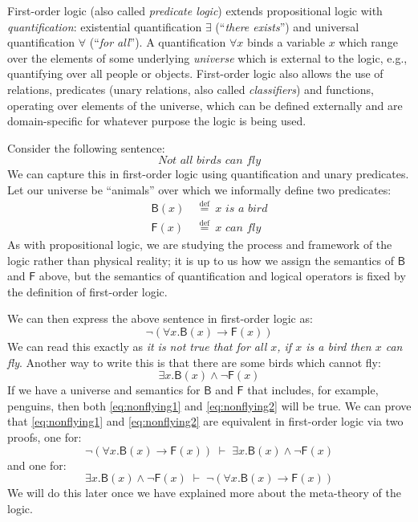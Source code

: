 \renewcommand{\highlight}[1]{%
  \colorbox{yellow!50}{$\displaystyle#1$}}
\newcommand{\highlightG}[1]{%
  \colorbox{green!30}{$\displaystyle#1$}}
\newcommand{\highlightR}[1]{%
  \colorbox{red!20}{$\displaystyle#1$}}

\newcommand{\rel}[1]{\mathsf{#1}}


First-order logic (also called \emph{predicate logic}) extends
propositional logic with \emph{quantification}: existential quantification
$\exists$ (``\emph{there exists}'') and universal quantification
$\forall$ (``\emph{for all}''). A quantification $\forall x$
binds a variable $x$ which range over the elements of some underlying
\emph{universe} which is external to the logic, e.g., quantifying
over all people or objects.  First-order logic also
allows the use of relations, predicates (unary relations, also called
\emph{classifiers}) and functions, operating
over elements of the universe, which can
be defined externally and are
domain-specific for whatever purpose the logic is being used.

Consider the following sentence:
%
\begin{equation*}
  \textit{Not all birds can fly}
\end{equation*}
%
We can capture this in first-order logic using quantification and
unary predicates. Let our universe be ``animals''
over which we informally define two predicates:
%
\begin{align*}
  \rel{B}(x)\ & \stackrel{\text{def}}{=}\ \textit{$x$ is a bird} \\
  \rel{F}(x)\ & \stackrel{\text{def}}{=}\ \textit{$x$ can fly}
\end{align*}
%
As with propositional logic, we are studying the process and framework
of the logic rather than physical reality; it is up to us how we
assign the semantics of $\rel{B}$ and $\rel{F}$ above, but the
semantics of quantification and logical operators is fixed by the
definition of first-order logic.

We can then express the above sentence in first-order logic as:
%
\begin{equation}
  \neg (\forall x . \rel{B}(x) \rightarrow \rel{F}(x))
  \label{eq:nonflying1}
\end{equation}
%
We can read this exactly as \emph{it is not true that for all $x$, if
  $x$ is a bird then $x$ can fly}. Another way to write this is
that there are some birds which cannot fly:
%
\begin{equation}
  \exists x . \rel{B}(x) \wedge \neg \rel{F}(x)
    \label{eq:nonflying2}
\end{equation}
%
If we have a universe and semantics for $\rel{B}$ and $\rel{F}$ that includes, for
example, penguins, then both \eqref{eq:nonflying1} and
\eqref{eq:nonflying2} will be true.
We can prove that \eqref{eq:nonflying1} and
\eqref{eq:nonflying2} are equivalent in first-order logic via two
proofs, one for:
$$\neg (\forall x . \rel{B}(x) \rightarrow \rel{F}(x)) \; \vdash \;
\exists x . \rel{B}(x) \wedge \neg \rel{F}(x)$$
and one for:
$$
\exists x . \rel{B}(x) \wedge \neg \rel{F}(x) \; \vdash \;
\neg (\forall x . \rel{B}(x) \rightarrow \rel{F}(x))
$$
We will do this later once we have explained more about the
meta-theory of the logic.

